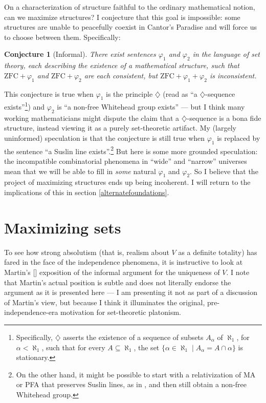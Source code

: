 \documentclass[letterpaper,12pt]{article}
\newcommand{\ZFC}{\mathrm{ZFC}}
\renewcommand{\phi}{\varphi}
\newtheorem{conjecture}{Conjecture}
\begin{document}
On a characterization of structure faithful to the ordinary mathematical notion, can we maximize structures? I conjecture that this goal is impossible: some structures are unable to peacefully coexist in Cantor's Paradise and will force us to choose between them. Specifically:

\begin{conjecture}[Informal]
There exist sentences $\phi_1$ and $\phi_2$ in the language of set theory, each describing the existence of a mathematical structure, such that $\ZFC + \phi_1$ and $\ZFC + \phi_2$ are each consistent, but $\ZFC + \phi_1 + \phi_2$ is inconsistent.
\end{conjecture}

This conjecture is true when $\phi_1$ is the principle $\diamondsuit$ (read as ``a $\diamondsuit$-sequence exists''\footnote{Specifically, $\diamondsuit$ asserts the existence of a sequence of subsets $A_\alpha$ of $\aleph_1$, for $\alpha < \aleph_1$, such that for every $A \subseteq \aleph_1$, the set $\{\alpha \in \aleph_1 \mid A_\alpha = A \cap \alpha\}$ is stationary.}) and $\phi_2$ is ``a non-free Whitehead group exists'' --- but I think many working mathematicians might dispute the claim that a $\diamondsuit$-sequence is a bona fide structure, instead viewing it as a purely set-theoretic artifact. My (largely uninformed) speculation is that the conjecture is still true when $\phi_1$ is replaced by the sentence ``a Suslin line exists''.\footnote{On the other hand, it might be possible to start with a relativization of MA or PFA that preserves Suslin lines, as in \cite{todorcevic2011forcing}, and then still obtain a non-free Whitehead group.} But here is some more grounded speculation: the incompatible combinatorial phenomena in ``wide'' and ``narrow'' universes mean that we will be able to fill in \emph{some} natural $\phi_1$ and $\phi_2$. So I believe that the project of maximizing structures ends up being incoherent. I will return to the implications of this in section \ref{alternatefoundations}.


\section{Maximizing sets}
\label{maximizingsets}
To see how strong absolutism (that is, realism about $V$ as a definite totality) has fared in the face of the independence phenomena, it is instructive to look at Martin's [\citeyear{martin2012completeness}] exposition of the informal argument for the uniqueness of $V$. I note that Martin's actual position is subtle and does not literally endorse the argument as it is presented here --- I am presenting it not as part of a discussion of Martin's view, but because I think it illuminates the original, pre-independence-era motivation for set-theoretic platonism.
\end{document}
